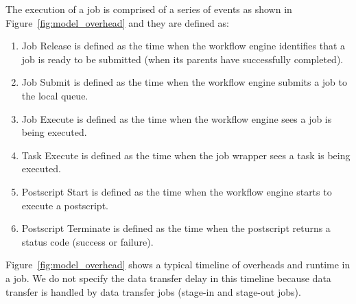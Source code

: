 The execution of a job is comprised of a series of events as shown in Figure~\ref{fig:model_overhead} and they are defined as:
\begin{enumerate}
\item Job Release is defined as the time when the workflow engine identifies that a job is ready to be submitted (when its parents have successfully completed). 
\item Job Submit is defined as the time when the workflow engine submits a job to the local queue. 
\item Job Execute is defined as the time when the workflow engine sees a job is being executed. 
\item Task Execute is defined as the time when the job wrapper sees a task is being executed. 

\item Postscript Start is defined as the time when the workflow engine starts to execute a postscript. 
\item Postscript Terminate is defined as the time when the postscript returns a status code (success or failure). 
\end{enumerate}

Figure~\ref{fig:model_overhead} shows a typical timeline of overheads and runtime in a job. We do not specify the data transfer delay in this timeline because data transfer is handled by data transfer jobs (stage-in and stage-out jobs). 

